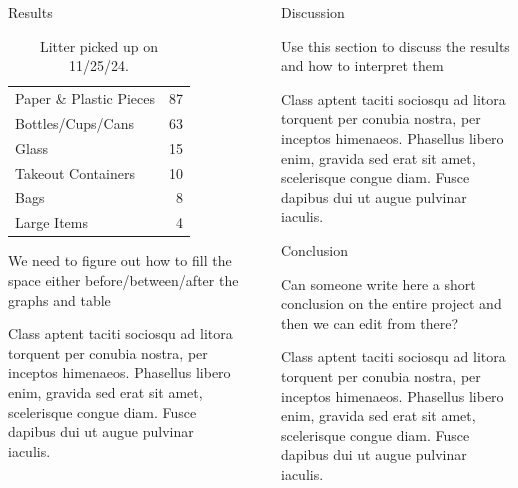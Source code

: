 \documentclass[final]{beamer}
\newlength{\sepwidth}
\newlength{\colwidth}
\newcommand{\separatorcolumn}{\begin{column}{\sepwidth}\end{column}}
\begin{document}
\begin{frame}[t]
\begin{columns}[t]
\begin{column}{\colwidth}
\begin{block}{Results}
\begin{table}
\begin{tabular}{l r }
              \midrule
              Paper \& Plastic Pieces& 87\\
              Bottles/Cups/Cans& 63\\
              Glass& 15\\
              Takeout Containers& 10\\
              Bags& 8\\
              Large Items& 4\\
              \bottomrule
            \end{tabular}
            \caption{Litter picked up on 11/25/24.}
          \end{table}

          We need to figure out how to fill the space either before/between/after the graphs and table\par
          Class aptent taciti sociosqu ad litora torquent per conubia nostra, per
          inceptos himenaeos. Phasellus libero enim, gravida sed erat sit amet,
          scelerisque congue diam. Fusce dapibus dui ut augue pulvinar iaculis.
        \end{block}

      \end{column}

      \separatorcolumn

      \begin{column}{\colwidth}

        \begin{block}{Discussion}
        
          Use this section to discuss the results and how to interpret them \par
          Class aptent taciti sociosqu ad litora torquent per conubia nostra, per
          inceptos himenaeos. Phasellus libero enim, gravida sed erat sit amet,
          scelerisque congue diam. Fusce dapibus dui ut augue pulvinar iaculis.

        \end{block}

        \begin{block}{Conclusion}
        
          Can someone write here a short conclusion on the entire project and then we can edit from there? \par
          Class aptent taciti sociosqu ad litora torquent per conubia nostra, per
          inceptos himenaeos. Phasellus libero enim, gravida sed erat sit amet,
          scelerisque congue diam. Fusce dapibus dui ut augue pulvinar iaculis.


\end{block}
\end{column}
\end{columns}
\end{frame}
\end{document}

